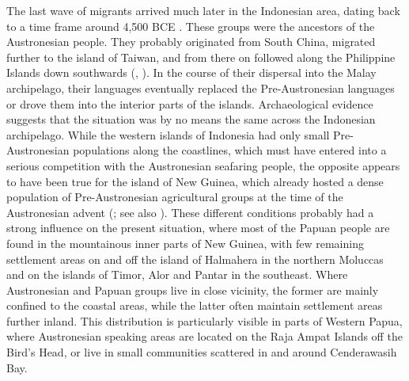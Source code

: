 The last wave of migrants arrived much later in the Indonesian area, dating back to a time frame around 4,500 BCE \citep{Bellwood1998;Bellwood2007}. These groups were the ancestors of the Austronesian people. They probably originated from South China, migrated further to the island of Taiwan, and from there on followed along the Philippine Islands down southwards (\citealt{Tryon1995}, \citealt{capelli2001}). In the course of their dispersal into the Malay archipelago, their languages eventually replaced the Pre-Austronesian languages or drove them into the interior parts of the islands. Archaeological evidence suggests that the situation was by no means the same across the Indonesian archipelago. While the western islands of Indonesia had only small Pre-Austronesian populations along the coastlines, which must have entered into a serious competition with the Austronesian seafaring people, the opposite appears to have been true for the island of New Guinea, which already hosted a dense population of Pre-Austronesian agricultural groups at the time of the Austronesian advent (\citealt{Bellwood1998}; see also \citealt{Ross2005}). These different conditions probably had a strong influence on the present situation, where most of the Papuan people are found in the mountainous inner parts of New Guinea, with few remaining settlement areas on and off the island of Halmahera in the northern Moluccas and on the islands of Timor, Alor and Pantar in the southeast. Where Austronesian and Papuan groups live in close vicinity, the former are mainly confined to the coastal areas, while the latter often maintain settlement areas further inland. This distribution is particularly visible in parts of Western Papua, where Austronesian speaking areas are located on the Raja Ampat Islands off the Bird's Head, or live in small communities scattered in and around Cenderawasih Bay.

